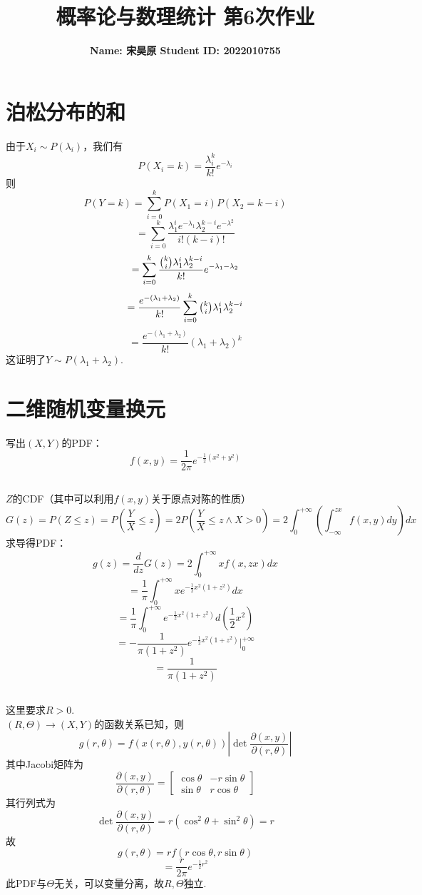 \documentclass{article}
\title{\bf\Large  概率论与数理统计 第6次作业}
\author{\bf Name: 宋昊原 \qquad Student ID: 2022010755}
\begin{document}
\begin{CJK}{UTF8}{gbsn}
\maketitle
\section{泊松分布的和}
由于$X_{i}\sim P(\lambda_{i})$，我们有
$$ P(X_{i}=k)=\frac{\lambda_{i}^{k}}{k!}e^{-\lambda_{i}}$$
则
$$ P(Y=k)=\sum\limits_{i=0}^{k}P(X_{1}=i)P(X_{2}=k-i)$$
$$ =\sum\limits_{i=0}^{k}\frac{\lambda_{1}^{i}e^{-\lambda_{1}}\lambda_{2}^{k-i}e^{-\lambda^{2}}}{i!(k-i)!}$$
$$ =\sum\limits_{i=0}^{k}\frac{\tbinom{k}{i}\lambda_{1}^{i}\lambda_{2}^{k-i}}{k!}e^{-\lambda_{1}-\lambda_{2}}$$
$$ =\frac{e^{-(\lambda_{1}+\lambda_{2})}}{k!}\sum\limits_{i=0}^{k}\tbinom{k}{i}\lambda_{1}^{i}\lambda_{2}^{k-i}$$
$$ =\frac{e^{-(\lambda_{1}+\lambda_{2})}}{k!}(\lambda_{1}+\lambda_{2})^{k}$$
这证明了$Y\sim P(\lambda_{1}+\lambda_{2})$.
\section{二维随机变量换元}
写出$(X,Y)$的PDF：
$$ f(x,y)=\frac{1}{2\pi}e^{-\frac{1}{2}(x^{2}+y^{2})}$$
\subsection{}
$Z$的CDF（其中可以利用$f(x,y)$关于原点对陈的性质）
$$ G(z)=P(Z\leq z)=P(\frac{Y}{X}\leq z)=2P(\frac{Y}{X}\leq z \land X>0)=2\int_{0}^{+\infty}(\int_{-\infty}^{zx}f(x,y)dy)dx$$
求导得PDF：
$$ g(z)=\frac{d}{dz}G(z)=2\int_{0}^{+\infty}xf(x,zx)dx$$
$$ =\frac{1}{\pi}\int_{0}^{+\infty}xe^{-\frac{1}{2}x^{2}(1+z^{2})}dx$$
$$ =\frac{1}{\pi}\int_{0}^{+\infty}e^{-\frac{1}{2}x^{2}(1+z^{2})}d(\frac{1}{2}x^{2})$$
$$ =-\frac{1}{\pi(1+z^{2})}e^{-\frac{1}{2}x^{2}(1+z^{2})}|_{0}^{+\infty}$$
$$ =\frac{1}{\pi(1+z^{2})}$$
\subsection{}
这里要求$R>0$.\\
$(R,\Theta)\to(X,Y)$的函数关系已知，则
$$ g(r,\theta)=f(x(r,\theta),y(r,\theta))|\det\frac{\partial(x,y)}{\partial(r,\theta)}|$$
其中Jacobi矩阵为
$$\frac{\partial(x,y)}{\partial(r,\theta)}=
\begin{bmatrix}
    \cos\theta & -r\sin\theta\\
    \sin\theta & r\cos\theta
\end{bmatrix}$$
其行列式为
$$ \det\frac{\partial(x,y)}{\partial(r,\theta)}=r(\cos^{2}\theta+\sin^{2}\theta)=r $$
故
$$ g(r,\theta)=rf(r\cos\theta,r\sin\theta) $$
$$ =\frac{r}{2\pi}e^{-\frac{1}{2}r^{2}}$$
此PDF与$\Theta$无关，可以变量分离，故$R,\Theta$独立.

\end{CJK}
\end{document}
